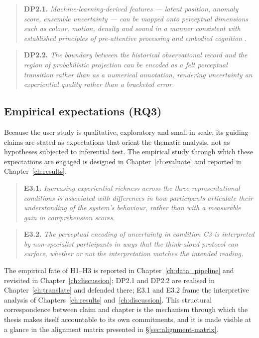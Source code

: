 \begin{quote}
\textbf{DP2.1.} \emph{Machine-learning-derived features --- latent position, anomaly score, ensemble uncertainty --- can be mapped onto perceptual dimensions such as colour, motion, density and sound in a manner consistent with established principles of pre-attentive processing and embodied cognition} \citep{ware2021, lakoff1999}.
\end{quote}

\begin{quote}
\textbf{DP2.2.} \emph{The boundary between the historical observational record and the region of probabilistic projection can be encoded as a felt perceptual transition rather than as a numerical annotation, rendering uncertainty an experiential quality rather than a bracketed error.}
\end{quote}

\subsection*{Empirical expectations (RQ3)}

Because the user study is qualitative, exploratory and small in scale, its guiding claims are stated as expectations that orient the thematic analysis, not as hypotheses subjected to inferential test. The empirical study through which these expectations are engaged is designed in Chapter~\ref{ch:evaluate} and reported in Chapter~\ref{ch:results}.

\begin{quote}
\textbf{E3.1.} \emph{Increasing experiential richness across the three representational conditions is associated with differences in how participants articulate their understanding of the system's behaviour, rather than with a measurable gain in comprehension scores.}
\end{quote}

\begin{quote}
\textbf{E3.2.} \emph{The perceptual encoding of uncertainty in condition C3 is interpreted by non-specialist participants in ways that the think-aloud protocol can surface, whether or not the interpretation matches the intended reading.}
\end{quote}

The empirical fate of H1--H3 is reported in Chapter~\ref{ch:data_pipeline} and revisited in Chapter~\ref{ch:discussion}; DP2.1 and DP2.2 are realised in Chapter~\ref{ch:translate} and defended there; E3.1 and E3.2 frame the interpretive analysis of Chapters~\ref{ch:results} and~\ref{ch:discussion}. This structural correspondence between claim and chapter is the mechanism through which the thesis makes itself accountable to its own commitments, and it is made visible at a glance in the alignment matrix presented in §\ref{sec:alignment-matrix}.

